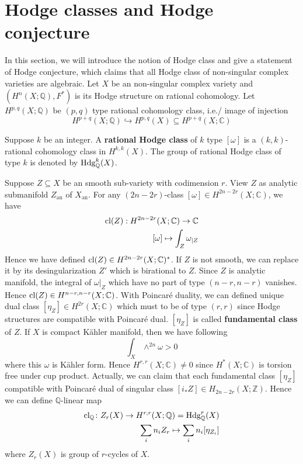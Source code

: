 \documentclass[11pt,oneside,a4paper]{amsart}
\begin{document}
\section{Hodge classes and Hodge conjecture}
In this section, we will introduce the notion of Hodge class and give a statement of Hodge conjecture, which claims that all Hodge class of non-singular complex varieties are algebraic. Let $X$ be an non-singular complex variety and $(H^n(X;\mathbb{Q}),F^*)$ is its Hodge structure on rational cohomology. Let $H^{p,q}(X;\mathbb{Q})$ be $(p,q)$ type rational cohomology class, i.e./ image of injection
\begin{equation}
	H^{p+q}(X;\mathbb{Q}) \hookrightarrow H^{p,q}(X) \subseteq H^{p+q}(X;\mathbb{C})
\end{equation}
\begin{secdefn}
	Suppose $k$ be an integer. A \textbf{rational Hodge class} of $k$ type $[\omega]$ is a $(k,k)$-rational cohomology class in $H^{k,k}(X)$. The group of rational Hodge class of type $k$ is denoted by $\operatorname{Hdg}_\mathbb{Q}^k(X)$.
\end{secdefn}
Suppose $Z \subseteq X$ be an smooth sub-variety with codimension $r$. View $Z$ as analytic submanifold $Z_\text{an}$ of $X_\text{an}$. For any $(2n-2r)$-class $[\omega] \in H^{2n-2r}(X;\mathbb{C})$, we have
\begin{align*}
\operatorname{cl}(Z):H^{2n-2r}(X;\mathbb{C}) \rightarrow \mathbb{C}\\
[\omega] \mapsto \int_{Z} \omega_{|Z}
\end{align*}
Hence we have defined $\operatorname{cl}(Z) \in H^{2n-2r}(X;\mathbb{C})^*$. If $Z$ is not smooth, we can replace it by its desingularization $Z'$ which is birational to $Z$. Since $Z$ is analytic manifold, the integral of $\omega|_Z$ which have no part of type $(n-r,n-r)$ vanishes. Hence $\operatorname{cl}(Z) \in H^{n-r,n-r}(X; \mathbb{C})$.
With Poincar\'e duality, we can defined unique dual class $[\eta_Z] \in H^{2r}(X;\mathbb{C})$ which must to be of type $(r,r)$ since Hodge structures are compatible with Poincar\'e dual. $[\eta_Z]$ is called \textbf{fundamental class} of $Z$.
If $X$ is compact K\"ahler manifold, then we have following 
\begin{equation}
	\int_{X} \wedge^{2n}\omega >0 
\end{equation}
where this $\omega$ is K\"ahler form. Hence $H^{r,r}(X;\mathbb{C}) \neq 0$ since $H^*(X;\mathbb{C})$ is torsion free under cup product.
Actually, we can claim that each fundamental class $[\eta_Z]$ compatible with Poincar\'e dual of singular class $[i_*Z] \in H_{2n-2r}(X;\mathbb{Z})$. Hence we can define $\mathbb{Q}$-linear map
\begin{align*}
	\operatorname{cl_\mathbb{Q}} \colon Z_r(X) \to H^{r,r}(X;\mathbb{Q})=\operatorname{Hdg}_\mathbb{Q}^r(X)\\
	\sum_i n_i Z_r \mapsto \sum_i n_i [\eta_{Z_i}]	
\end{align*}
where $Z_r(X)$ is group of $r$-cycles of $X$.
\end{document}
